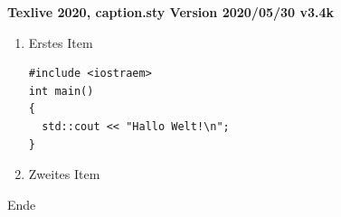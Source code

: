 \documentclass{book}
\begin{document}
{\bfseries Texlive 2020, caption.sty Version 2020/05/30 v3.4k}

\begin{enumerate}
\item Erstes Item

\begin{lstlisting}[caption={Überschrift}]
#include <iostraem>
int main()
{
  std::cout << "Hallo Welt!\n";
}\end{lstlisting}

\item Zweites Item

\end{enumerate}

Ende 
\end{document}
